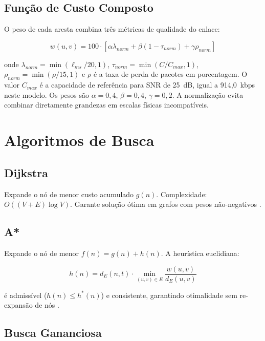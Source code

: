 \documentclass[conference]{IEEEtran}
\begin{document}
\subsection{Função de Custo Composto}

O peso de cada aresta combina três métricas de qualidade do enlace:

\begin{equation}
  w(u,v) =
  100 \cdot \left[
    \alpha \lambda_{norm} +
    \beta (1 - \tau_{norm}) +
    \gamma \rho_{norm}
  \right]
  \label{eq:peso}
\end{equation}

onde $\lambda_{norm} = \min(\ell_{ms}/20,1)$, $\tau_{norm} =
\min(C/C_{max},1)$, $\rho_{norm} = \min(\rho/15,1)$ e $\rho$ é a taxa de
perda de pacotes em porcentagem. O valor $C_{max}$ é a capacidade de
referência para SNR de 25~dB, igual a 914{,}0~kbps neste modelo. Os pesos são
$\alpha = 0{,}4$,
$\beta = 0{,}4$, $\gamma = 0{,}2$. A normalização evita combinar diretamente
grandezas em escalas físicas incompatíveis.

\section{Algoritmos de Busca}

\subsection{Dijkstra}

Expande o nó de menor custo acumulado $g(n)$.
Complexidade: $O((V+E)\log V)$.
Garante solução ótima em grafos com pesos não-negativos \cite{cormen2022}.

\subsection{A*}

Expande o nó de menor $f(n) = g(n) + h(n)$.
A heurística euclidiana:

\begin{equation}
  h(n) = d_E(n, t) \cdot \min_{(u,v) \in E} \frac{w(u,v)}{d_E(u,v)}
  \label{eq:heuristica}
\end{equation}

é admissível ($h(n) \leq h^*(n)$) e consistente, garantindo otimalidade
sem re-expansão de nós \cite{hart1968}.

\subsection{Busca Gananciosa}
\end{document}
